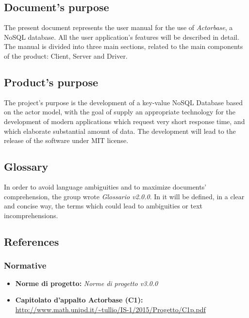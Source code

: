 \documentclass[a4paper]{article}
\begin{document}
	\subsection{Document's purpose}
		The present document represents the user manual for the use of \emph{Actorbase}, a NoSQL database. All the user application's features will be described in detail. The manual is divided into three main sections, related to the main components of the product: Client, Server and Driver.
	\subsection{Product's purpose}
		The project's purpose is the development of a key-value NoSQL Database based on the actor model, with the goal of supply an appropriate technology for the development of modern applications which request very short response time, and which elaborate substantial amount of data. The development will lead to the release of the software under MIT license.
	\subsection{Glossary}
		In order to avoid language ambiguities and to maximize documents' comprehension, the group wrote \emph{Glossario v2.0.0}. In it will be defined, in a clear and concise way, the terms which could lead to ambiguities or text incomprehensions.
	\subsection{References}
	\subsubsection{Normative}
		\begin{itemize}
			\item \textbf{Norme di progetto:} \emph{Norme di progetto v3.0.0}
			\item \textbf{Capitolato d'appalto Actorbase (C1):} \\ 
			\url{http://www.math.unipd.it/~tullio/IS-1/2015/Progetto/C1p.pdf}
		\end{itemize}
	\newpage
\end{document}
